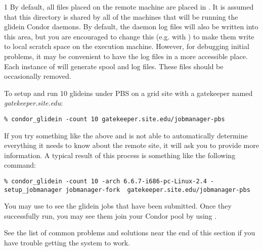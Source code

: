 \begin{ManPage}{\label{man-condor-glidein}}{1}
By default, all files placed on the remote machine are placed in
.  It is assumed that this
directory is shared by all of the machines that will be running
the glidein Condor daemons.  By default, the daemon log files will also
be written into this area, but you are encouraged
to change this (e.g. with ) to make them write to local
scratch space on the execution machine.  However, for debugging
initial problems, it may be convenient to have the log files
in a more accessible place.
Each instance of  will generate spool and log
files.  These files should be occasionally removed.

\Examples

To setup and run 10 glideins under PBS on a grid site with a
gatekeeper named \textit{gatekeeper.site.edu}:
\begin{verbatim}
% condor_glidein -count 10 gatekeeper.site.edu/jobmanager-pbs
\end{verbatim}

If you try something like the above and  is not able to
automatically determine everything it needs to know about the remote site,
it will ask you to provide more information.  A typical result of this
process is something like the following command:
\begin{verbatim}
% condor_glidein -count 10 -arch 6.6.7-i686-pc-Linux-2.4 -setup_jobmanager jobmanager-fork  gatekeeper.site.edu/jobmanager-pbs
\end{verbatim}

You may use  to see the glidein jobs that have been
submitted.  Once they successfully run, you may see them join your
Condor pool by using .

See the list of common problems and solutions near the end of this section
if you have trouble getting the system to work.


\end{ManPage}
